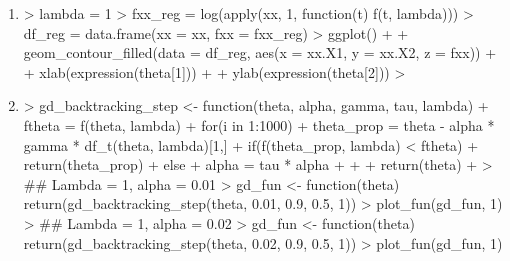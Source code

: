 \begin{enumerate}
\item 
\begin{Schunk}
\begin{Sinput}
> lambda = 1
> fxx_reg = log(apply(xx, 1, function(t) f(t, lambda)))
> df_reg = data.frame(xx = xx, fxx = fxx_reg)
> ggplot() +
+     geom_contour_filled(data = df_reg, aes(x = xx.X1, y = xx.X2, z = fxx)) +
+     xlab(expression(theta[1])) +
+     ylab(expression(theta[2])) 
> 
\end{Sinput}
\end{Schunk}
\item
\begin{Schunk}
\begin{Sinput}
> gd_backtracking_step <- function(theta, alpha, gamma, tau, lambda){
+     ftheta = f(theta, lambda)
+     for(i in 1:1000){
+       theta_prop = theta - alpha * gamma * df_t(theta, lambda)[1,]
+       if(f(theta_prop, lambda) < ftheta){
+         return(theta_prop)
+       }else{
+         alpha = tau * alpha
+       }
+     }
+     return(theta)
+ }
> ## Lambda = 1, alpha = 0.01
> gd_fun <- function(theta) return(gd_backtracking_step(theta, 0.01, 0.9, 0.5, 1))
> plot_fun(gd_fun, 1)
> ## Lambda = 1, alpha = 0.02
> gd_fun <- function(theta) return(gd_backtracking_step(theta, 0.02, 0.9, 0.5, 1))
> plot_fun(gd_fun, 1)
\end{Sinput}
\end{Schunk}
\end{enumerate}
